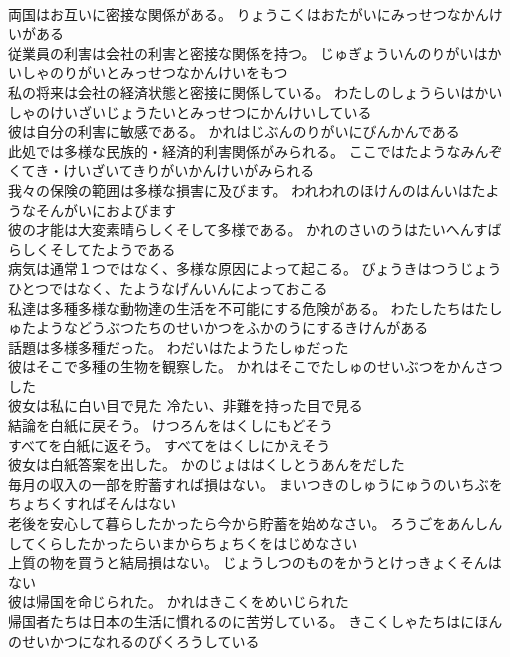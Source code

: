 \documentclass[8pt]{extreport}
\begin{document}
\begin{CJK}{UTF8}{min}
\\	両国はお互いに密接な関係がある。	りょうこくはおたがいにみっせつなかんけいがある 
\\	従業員の利害は会社の利害と密接な関係を持つ。	じゅぎょういんのりがいはかいしゃのりがいとみっせつなかんけいをもつ 
\\	私の将来は会社の経済状態と密接に関係している。	わたしのしょうらいはかいしゃのけいざいじょうたいとみっせつにかんけいしている 
\\	彼は自分の利害に敏感である。	かれはじぶんのりがいにびんかんである 
\\	此処では多様な民族的・経済的利害関係がみられる。	ここではたようなみんぞくてき・けいざいてきりがいかんけいがみられる 
\\	我々の保険の範囲は多様な損害に及びます。	われわれのほけんのはんいはたようなそんがいにおよびます 
\\	彼の才能は大変素晴らしくそして多様である。	かれのさいのうはたいへんすばらしくそしてたようである 
\\	病気は通常１つではなく、多様な原因によって起こる。	びょうきはつうじょうひとつではなく、たようなげんいんによっておこる 
\\	私達は多種多様な動物達の生活を不可能にする危険がある。	わたしたちはたしゅたようなどうぶつたちのせいかつをふかのうにするきけんがある 
\\	話題は多様多種だった。	わだいはたようたしゅだった 
\\	彼はそこで多種の生物を観察した。	かれはそこでたしゅのせいぶつをかんさつした 
\\	彼女は私に白い目で見た	冷たい、非難を持った目で見る
\\	結論を白紙に戻そう。	けつろんをはくしにもどそう 
\\	すべてを白紙に返そう。	すべてをはくしにかえそう 
\\	彼女は白紙答案を出した。	かのじょははくしとうあんをだした 
\\	毎月の収入の一部を貯蓄すれば損はない。	まいつきのしゅうにゅうのいちぶをちょちくすればそんはない 
\\	老後を安心して暮らしたかったら今から貯蓄を始めなさい。	ろうごをあんしんしてくらしたかったらいまからちょちくをはじめなさい 
\\	上質の物を買うと結局損はない。	じょうしつのものをかうとけっきょくそんはない 
\\	彼は帰国を命じられた。	かれはきこくをめいじられた 
\\	帰国者たちは日本の生活に慣れるのに苦労している。	きこくしゃたちはにほんのせいかつになれるのびくろうしている 

\end{CJK}
\end{document}
